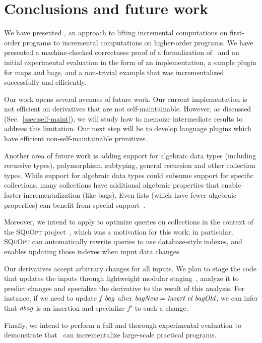 \section{Conclusions and future work}
\label{sec:concl}
\label{ssec:future}
We have presented \ILC, an approach to lifting incremental computations
on first-order programs to incremental computations on higher-order
programs. We have presented a machine-checked correctness proof 
of a formalization of \ILC\ and an initial experimental evaluation
in the form of an implementation, a sample plugin for maps and bags,
and a non-trivial example that was incrementalized successfully and
efficiently. 

Our work opens several avenues of future work. Our current implementation
is not efficient on derivatives that are not self-maintainable.
However, as discussed
(Sec.~\ref{ssec:self-maint}), we will study how
to memoize intermediate results to address this limitation. Our next
step will be to develop language plugins which
have efficient non-self-maintainable primitives.

Another area of future work is adding support for algebraic data
types (including recursive types), polymorphism, subtyping, general recursion
and other collection types. While support for algebraic data
types could subsume support for specific collections, many
collections have additional algebraic properties that enable faster
incrementalization (like bags). Even lists (which have fewer algebraic properties)
can benefit from special support~\citep{Maier2013}.

Moreover, we intend to apply \ILC{} to optimize queries on
collections in the context of the \textsc{SQuOpt}
project~\citep{GiarrussoAOSD13}, which was a motivation for this
work; in particular, \textsc{SQuOpt} can automatically rewrite
queries to use database-style indexes, and \ILC{} enables
updating those indexes when input data changes.

\begin{oldSec}
Our derivatives accept arbitrary changes for all inputs. We plan
to stage the code that updates the inputs through lightweight
modular staging~\citep{rompf2010lightweight}, analyze it to
predict changes and specialize the derivative to the result of
this analysis. For instance, if we need to update $\mathit{f} \;
\mathit{bag}$ after $\mathit{bagNew} = \mathit{insert} \; \mathit{el} \;
\mathit{bagOld}$, we can infer that $\mathit{dbag}$ is an insertion
and specialize $f'$ to such a change.
\end{oldSec}

Finally, we intend to perform a full and thorough experimental evaluation
to demonstrate that \ILC\ can incrementalize large-scale practical programs.
